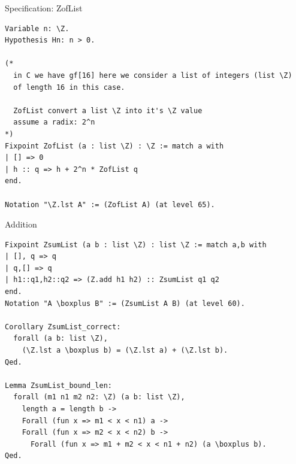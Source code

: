 \documentclass[8pt]{beamer}
\begin{document}
\begin{frame}[fragile]{Specification: ZofList}
  \begin{center}
\begin{lstlisting}[language=CoqD, caption=ZofList, label=cod:languageC81]
Variable n: \Z.
Hypothesis Hn: n > 0.

(*
  in C we have gf[16] here we consider a list of integers (list \Z)
  of length 16 in this case.

  ZofList convert a list \Z into it's \Z value
  assume a radix: 2^n
*)
Fixpoint ZofList (a : list \Z) : \Z := match a with
| [] => 0
| h :: q => h + 2^n * ZofList q
end.

Notation "\Z.lst A" := (ZofList A) (at level 65).
\end{lstlisting}






  \end{center}
\end{frame}


%
%

\begin{frame}[fragile]{Addition}
  \begin{center}
\begin{lstlisting}[language=CoqD, caption=Addition, label=cod:languageC91]
Fixpoint ZsumList (a b : list \Z) : list \Z := match a,b with
| [], q => q
| q,[] => q
| h1::q1,h2::q2 => (Z.add h1 h2) :: ZsumList q1 q2
end.
Notation "A \boxplus B" := (ZsumList A B) (at level 60).

Corollary ZsumList_correct:
  forall (a b: list \Z),
    (\Z.lst a \boxplus b) = (\Z.lst a) + (\Z.lst b).
Qed.

Lemma ZsumList_bound_len:
  forall (m1 n1 m2 n2: \Z) (a b: list \Z),
    length a = length b ->
    Forall (fun x => m1 < x < n1) a ->
    Forall (fun x => m2 < x < n2) b ->
      Forall (fun x => m1 + m2 < x < n1 + n2) (a \boxplus b).
Qed.
\end{lstlisting}

  \end{center}
\end{frame}
\end{document}
